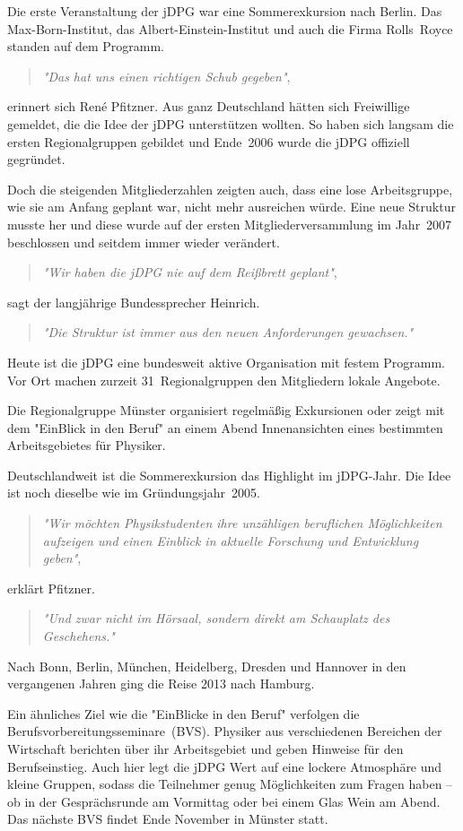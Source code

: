 \begin{multicols}{2}
Die erste Veranstaltung der jDPG war eine Sommerexkursion nach Berlin. Das Max-Born-Institut, das Albert-Einstein-Institut und auch die Firma Rolls~Royce standen auf dem Programm.

\begin{quote}
\textit{"Das hat uns einen richtigen Schub gegeben"},
\end{quote}
erinnert sich René Pfitzner. Aus ganz Deutschland hätten sich Freiwillige gemeldet, die die Idee der jDPG unterstützen wollten. So haben sich langsam die ersten Regionalgruppen gebildet und Ende~2006 wurde die jDPG offiziell gegründet.

Doch die steigenden Mitgliederzahlen zeigten auch, dass eine lose Arbeitsgruppe, wie sie am Anfang geplant war, nicht mehr ausreichen würde. Eine neue Struktur musste her und diese wurde auf der ersten Mitgliederversammlung im Jahr~2007 beschlossen und seitdem immer wieder verändert.

\begin{quote}
\textit{"Wir haben die jDPG nie auf dem Reißbrett geplant"},
\end{quote}
sagt der langjährige Bundessprecher Heinrich.
\begin{quote}
\textit{"Die Struktur ist immer aus den neuen Anforderungen gewachsen."}
\end{quote}

Heute ist die jDPG eine bundesweit aktive Organisation mit festem Programm. Vor Ort machen zurzeit 31~Regionalgruppen den Mitgliedern lokale Angebote.

Die Regionalgruppe Münster organisiert regelmäßig Exkursionen oder zeigt mit dem "EinBlick in den Beruf" an einem Abend Innenansichten eines bestimmten Arbeitsgebietes für Physiker.

Deutschlandweit ist die Sommerexkursion das Highlight im jDPG-Jahr. Die Idee ist noch dieselbe wie im Gründungsjahr~2005.
\begin{quote}
\textit{"Wir möchten Physikstudenten ihre unzähligen beruflichen Möglichkeiten aufzeigen und einen Einblick in aktuelle Forschung und Entwicklung geben"},
\end{quote}
erklärt Pfitzner.
\begin{quote}
\textit{"Und zwar nicht im Hörsaal, sondern direkt am Schauplatz des Geschehens."}
\end{quote}
Nach Bonn, Berlin, München, Heidelberg, Dresden und Hannover in den vergangenen Jahren ging die Reise 2013 nach Hamburg.

Ein ähnliches Ziel wie die "EinBlicke in den Beruf" verfolgen die Berufsvorbereitungsseminare~(BVS). Physiker aus verschiedenen Bereichen der Wirtschaft berichten über ihr Arbeitsgebiet und geben Hinweise für den Berufseinstieg. Auch hier legt die jDPG Wert auf eine lockere Atmosphäre und kleine Gruppen, sodass die Teilnehmer genug Möglichkeiten zum Fragen haben -- ob in der Gesprächsrunde am Vormittag oder bei einem Glas Wein am Abend. Das nächste BVS findet Ende November in Münster statt.


\end{multicols}
